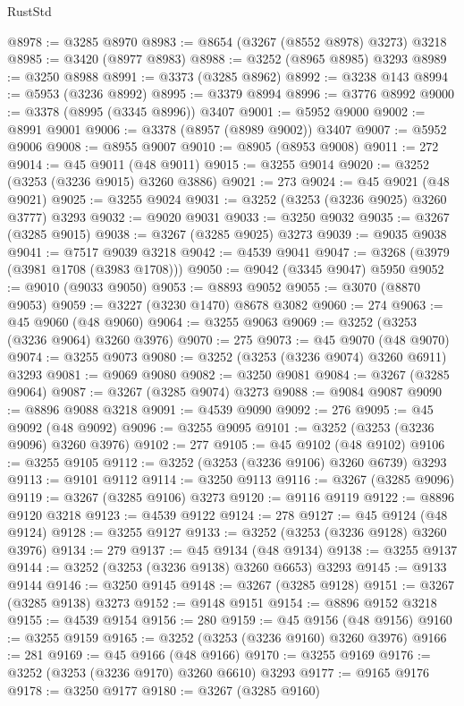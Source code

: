 \begin{lexlean}{RustStd}
\begin{coremodule}
{\begin{coremodule}
{{{{{{{{{{{{{{{{{{{{{{{{{{{{{{{{{{{{{{{@8978 := @3285 @8970
@8983 := @8654 (@3267 (@8552 @8978) @3273) @3218
@8985 := @3420 (@8977 @8983)
@8988 := @3252 (@8965 @8985) @3293
@8989 := @3250 @8988
@8991 := @3373 (@3285 @8962)
@8992 := @3238 @143
@8994 := @5953 (@3236 @8992)
@8995 := @3379 @8994
@8996 := @3776 @8992
@9000 := @3378 (@8995 (@3345 @8996)) @3407
@9001 := @5952 @9000
@9002 := @8991 @9001
@9006 := @3378 (@8957 (@8989 @9002)) @3407
@9007 := @5952 @9006
@9008 := @8955 @9007
@9010 := @8905 (@8953 @9008)
@9011 := 272
@9014 := @45 @9011 (@48 @9011)
@9015 := @3255 @9014
@9020 := @3252 (@3253 (@3236 @9015) @3260 @3886)
@9021 := 273
@9024 := @45 @9021 (@48 @9021)
@9025 := @3255 @9024
@9031 := @3252 (@3253 (@3236 @9025) @3260 @3777) @3293
@9032 := @9020 @9031
@9033 := @3250 @9032
@9035 := @3267 (@3285 @9015)
@9038 := @3267 (@3285 @9025) @3273
@9039 := @9035 @9038
@9041 := @7517 @9039 @3218
@9042 := @4539 @9041
@9047 := @3268 (@3979 (@3981 @1708 (@3983 @1708)))
@9050 := @9042 (@3345 @9047) @5950
@9052 := @9010 (@9033 @9050)
@9053 := @8893 @9052
@9055 := @3070 (@8870 @9053)
@9059 := @3227 (@3230 @1470) @8678 @3082
@9060 := 274
@9063 := @45 @9060 (@48 @9060)
@9064 := @3255 @9063
@9069 := @3252 (@3253 (@3236 @9064) @3260 @3976)
@9070 := 275
@9073 := @45 @9070 (@48 @9070)
@9074 := @3255 @9073
@9080 := @3252 (@3253 (@3236 @9074) @3260 @6911) @3293
@9081 := @9069 @9080
@9082 := @3250 @9081
@9084 := @3267 (@3285 @9064)
@9087 := @3267 (@3285 @9074) @3273
@9088 := @9084 @9087
@9090 := @8896 @9088 @3218
@9091 := @4539 @9090
@9092 := 276
@9095 := @45 @9092 (@48 @9092)
@9096 := @3255 @9095
@9101 := @3252 (@3253 (@3236 @9096) @3260 @3976)
@9102 := 277
@9105 := @45 @9102 (@48 @9102)
@9106 := @3255 @9105
@9112 := @3252 (@3253 (@3236 @9106) @3260 @6739) @3293
@9113 := @9101 @9112
@9114 := @3250 @9113
@9116 := @3267 (@3285 @9096)
@9119 := @3267 (@3285 @9106) @3273
@9120 := @9116 @9119
@9122 := @8896 @9120 @3218
@9123 := @4539 @9122
@9124 := 278
@9127 := @45 @9124 (@48 @9124)
@9128 := @3255 @9127
@9133 := @3252 (@3253 (@3236 @9128) @3260 @3976)
@9134 := 279
@9137 := @45 @9134 (@48 @9134)
@9138 := @3255 @9137
@9144 := @3252 (@3253 (@3236 @9138) @3260 @6653) @3293
@9145 := @9133 @9144
@9146 := @3250 @9145
@9148 := @3267 (@3285 @9128)
@9151 := @3267 (@3285 @9138) @3273
@9152 := @9148 @9151
@9154 := @8896 @9152 @3218
@9155 := @4539 @9154
@9156 := 280
@9159 := @45 @9156 (@48 @9156)
@9160 := @3255 @9159
@9165 := @3252 (@3253 (@3236 @9160) @3260 @3976)
@9166 := 281
@9169 := @45 @9166 (@48 @9166)
@9170 := @3255 @9169
@9176 := @3252 (@3253 (@3236 @9170) @3260 @6610) @3293
@9177 := @9165 @9176
@9178 := @3250 @9177
@9180 := @3267 (@3285 @9160)
}}}}}}}}}}}}}}}}}}}}}}}}}}}}}}}}}}}}}}}
\end{coremodule}}
\end{coremodule}
\end{lexlean}

